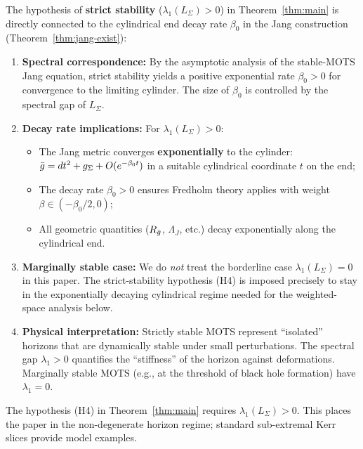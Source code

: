 \begin{remark}\label{rem:mots-decay-alignment}
The hypothesis of \textbf{strict stability} ($\lambda_1(L_\Sigma) > 0$) in Theorem~\ref{thm:main} is directly connected to the cylindrical end decay rate $\beta_0$ in the Jang construction (Theorem~\ref{thm:jang-exist}):
\begin{enumerate}[label=\textup{(\roman*)}]
    \item \textbf{Spectral correspondence:} By the asymptotic analysis of the stable-MOTS Jang equation, strict stability yields a positive exponential rate $\beta_0>0$ for convergence to the limiting cylinder. The size of $\beta_0$ is controlled by the spectral gap of $L_\Sigma$.
    
    \item \textbf{Decay rate implications:} For $\lambda_1(L_\Sigma) > 0$:
    \begin{itemize}
        \item The Jang metric converges \textbf{exponentially} to the cylinder: $\bar{g} = dt^2 + g_\Sigma + O(e^{-\beta_0 t})$ in a suitable cylindrical coordinate $t$ on the end;
        \item The decay rate $\beta_0 > 0$ ensures Fredholm theory applies with weight $\beta \in (-\beta_0/2, 0)$;
        \item All geometric quantities ($R_{\bar{g}}$, $\Lambda_J$, etc.) decay exponentially along the cylindrical end.
    \end{itemize}
    
    \item \textbf{Marginally stable case:} We do \emph{not} treat the borderline case $\lambda_1(L_\Sigma)=0$ in this paper. The strict-stability hypothesis (H4) is imposed precisely to stay in the exponentially decaying cylindrical regime needed for the weighted-space analysis below.
    
    \item \textbf{Physical interpretation:} Strictly stable MOTS represent ``isolated'' horizons that are dynamically stable under small perturbations. The spectral gap $\lambda_1 > 0$ quantifies the ``stiffness'' of the horizon against deformations. Marginally stable MOTS (e.g., at the threshold of black hole formation) have $\lambda_1 = 0$.
\end{enumerate}
The hypothesis (H4) in Theorem~\ref{thm:main} requires $\lambda_1(L_\Sigma) > 0$. This places the paper in the non-degenerate horizon regime; standard sub-extremal Kerr slices provide model examples.
\end{remark}

